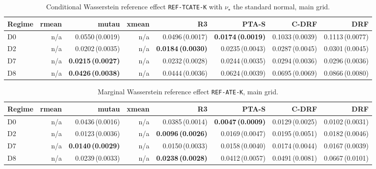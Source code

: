 \begin{table}[htbp]
\centering
\caption{Conditional Wasserstein reference effect \texttt{REF-TCATE-K} with $\nu_\star$ the standard normal, main grid.}
\label{tab:p55-reftcate}
\scriptsize
\setlength{\tabcolsep}{3.2pt}
\begin{tabular}{@{}lrrrrrrr@{}}
\toprule
Regime & rmean & mutau & xmean & R3 & PTA-S & C-DRF & DRF \\
\midrule
D0 & n/a & 0.0550\,(0.0019) & n/a & 0.0496\,(0.0017) & \textbf{0.0174\,(0.0019)} & 0.1033\,(0.0039) & 0.1113\,(0.0077) \\
D2 & n/a & 0.0202\,(0.0035) & n/a & \textbf{0.0184\,(0.0030)} & 0.0235\,(0.0043) & 0.0287\,(0.0045) & 0.0301\,(0.0045) \\
D7 & n/a & \textbf{0.0215\,(0.0027)} & n/a & 0.0232\,(0.0028) & 0.0244\,(0.0035) & 0.0294\,(0.0036) & 0.0296\,(0.0036) \\
D8 & n/a & \textbf{0.0426\,(0.0038)} & n/a & 0.0444\,(0.0036) & 0.0624\,(0.0039) & 0.0695\,(0.0069) & 0.0866\,(0.0080) \\
\bottomrule
\end{tabular}
\end{table}

\begin{table}[htbp]
\centering
\caption{Marginal Wasserstein reference effect \texttt{REF-ATE-K}, main grid.}
\label{tab:p55-refate}
\scriptsize
\setlength{\tabcolsep}{3.2pt}
\begin{tabular}{@{}lrrrrrrr@{}}
\toprule
Regime & rmean & mutau & xmean & R3 & PTA-S & C-DRF & DRF \\
\midrule
D0 & n/a & 0.0436\,(0.0016) & n/a & 0.0385\,(0.0014) & \textbf{0.0047\,(0.0009)} & 0.0129\,(0.0025) & 0.0102\,(0.0031) \\
D2 & n/a & 0.0123\,(0.0036) & n/a & \textbf{0.0096\,(0.0026)} & 0.0169\,(0.0047) & 0.0195\,(0.0051) & 0.0182\,(0.0046) \\
D7 & n/a & \textbf{0.0140\,(0.0029)} & n/a & 0.0150\,(0.0033) & 0.0158\,(0.0040) & 0.0174\,(0.0044) & 0.0167\,(0.0039) \\
D8 & n/a & 0.0239\,(0.0033) & n/a & \textbf{0.0238\,(0.0028)} & 0.0412\,(0.0057) & 0.0491\,(0.0081) & 0.0667\,(0.0101) \\
\bottomrule
\end{tabular}
\end{table}

